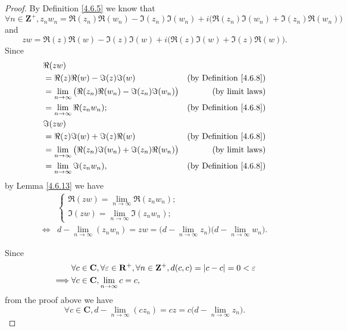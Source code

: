\begin{proof}
    By Definition \ref{4.6.5} we know that
    \[
        \forall n \in \mathbf{Z}^+, z_n w_n = \Re(z_n) \Re(w_n) - \Im(z_n) \Im(w_n) + i \big(\Re(z_n) \Im(w_n) + \Im(z_n) \Re(w_n)\big)
    \]
    and
    \[
        z w = \Re(z) \Re(w) - \Im(z) \Im(w) + i \big(\Re(z) \Im(w) + \Im(z) \Re(w)\big).
    \]
    Since
    \begin{align*}
         & \Re(zw)                                                                                                    \\
         & = \Re(z) \Re(w) - \Im(z) \Im(w)                                       & \text{(by Definition \ref{4.6.8})} \\
         & = \lim_{n \to \infty} \big(\Re(z_n) \Re(w_n) - \Im(z_n) \Im(w_n)\big) & \text{(by limit laws)}             \\
         & = \lim_{n \to \infty} \Re(z_n w_n);                                   & \text{(by Definition \ref{4.6.8})} \\
         & \Im(zw)                                                                                                    \\
         & = \Re(z) \Im(w) + \Im(z) \Re(w)                                       & \text{(by Definition \ref{4.6.8})} \\
         & = \lim_{n \to \infty} \big(\Re(z_n) \Im(w_n) + \Im(z_n) \Re(w_n)\big) & \text{(by limit laws)}             \\
         & = \lim_{n \to \infty} \Im(z_n w_n),                                   & \text{(by Definition \ref{4.6.8})}
    \end{align*}
    by Lemma \ref{4.6.13} we have
    \begin{align*}
             & \begin{cases}
                   \Re(zw) = \lim_{n \to \infty} \Re(z_n w_n); \\
                   \Im(zw) = \lim_{n \to \infty} \Im(z_n w_n);
               \end{cases}                                                                           \\
        \iff & d - \lim_{n \to \infty} (z_n w_n) = zw = \big(d - \lim_{n \to \infty} z_n\big) \big(d - \lim_{n \to \infty} w_n\big).
    \end{align*}

    Since
    \begin{align*}
                 & \forall c \in \mathbf{C}, \forall \varepsilon \in \mathbf{R}^+, \forall n \in \mathbf{Z}^+, d(c, c) = \abs*{c - c} = 0 < \varepsilon \\
        \implies & \forall c \in \mathbf{C}, \lim_{n \to \infty} c = c,
    \end{align*}
    from the proof above we have
    \[
        \forall c \in \mathbf{C}, d - \lim_{n \to \infty} (c z_n) = cz = c \big(d - \lim_{n \to \infty} z_n\big).
    \]


\end{proof}
